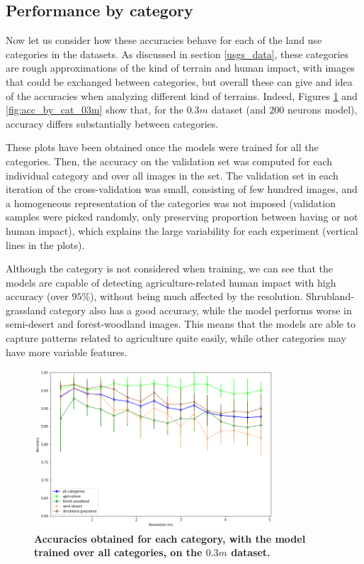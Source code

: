 \subsection{Performance by category}

Now let us consider how these accuracies behave for each of the land use categories in the datasets. As discussed in section \ref{usgs_data}, these categories are rough approximations of the kind of terrain and human impact, with images that could be exchanged between categories, but overall these can give and idea of the accuracies when analyzing different kind of terrains. Indeed, Figures \ref{fig:acc_all_cat_03m} and \ref{fig:acc_by_cat_03m} show that, for the $0.3m$ dataset (and $200$ neurons model), accuracy differs substantially between categories.

These plots have been obtained once the models were trained for all the categories. Then, the accuracy on the validation set was computed for each individual category and over all images in the set. The validation set in each iteration of the cross-validation was small, consisting of few hundred images, and a homogeneous representation of the categories was not imposed (validation samples were picked randomly, only preserving proportion between having or not human impact), which explains the large variability for each experiment (vertical lines in the plots).

Although the category is not considered when training, we can see that the models are capable of detecting agriculture-related human impact with high accuracy (over $95\%$), without being much affected by the resolution. Shrubland-grassland category also has a good accuracy, while the model performs worse in semi-desert and forest-woodland images. This means that the models are able to capture patterns related to agriculture quite easily, while other categories may have more variable features.

\begin{figure}[H]
	\centering
	\includegraphics[width=0.8\textwidth]{Figures/results/acc_res_all_categories_03m.png}
	\captionsetup{width=1\linewidth}
	\caption{\textbf{Accuracies obtained for each category, with the model trained over all categories, on the $0.3m$ dataset.}}
	\label{fig:acc_all_cat_03m}
\end{figure}

